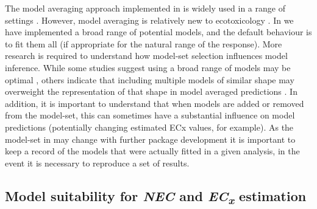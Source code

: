 \documentclass[
  shortnames]{jss}
\begin{document}
The model averaging approach implemented in  is widely used in a range of settings \citep[in ecology for example, see][ for a thorough review]{Dormann2018}. However, model averaging is relatively new to ecotoxicology \citep[but see, for example,][]{Shao2014, Thorley2018, fox2020, Wheeler2009}. In  we have implemented a broad range of potential models, and the default behaviour is to fit them all (if appropriate for the natural range of the response). More research is required to understand how model-set selection influences model inference. While some studies suggest using a broad range of models may be optimal \citep{Wheeler2009}, others indicate that including multiple models of similar shape may overweight the representation of that shape in model averaged predictions \citep{fox2020}. In addition, it is important to understand that when models are added or removed from the model-set, this can sometimes have a substantial influence on model predictions (potentially changing estimated ECx values, for example). As the model-set in  may change with further package development it is important to keep a record of the models that were actually fitted in a given analysis, in the event it is necessary to reproduce a set of results.

\subsection[Model suitability for NEC and ECx estimation]{Model suitability for \textit{NEC} and \textit{EC\textsubscript{x}} estimation}\label{modsuit}
\end{document}
